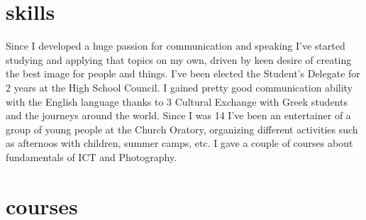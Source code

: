 \documentclass[]{friggeri-cv}
\begin{document}
\section{skills}

Since I developed a huge passion for communication and speaking I've started studying and applying that topics on my own, driven by keen desire of creating the best image for people and things. I've been elected the Student's Delegate for 2 years at the High School Council. I gained pretty good communication ability with the English language thanks to 3 Cultural Exchange with Greek students and the journeys around the world. Since I was 14 I've been an entertainer of a group of young people at the Church Oratory, organizing different activities such as afternoos with children, summer camps, etc. I gave a couple of courses about fundamentals of ICT and Photography.

\section{courses}
\end{document}
